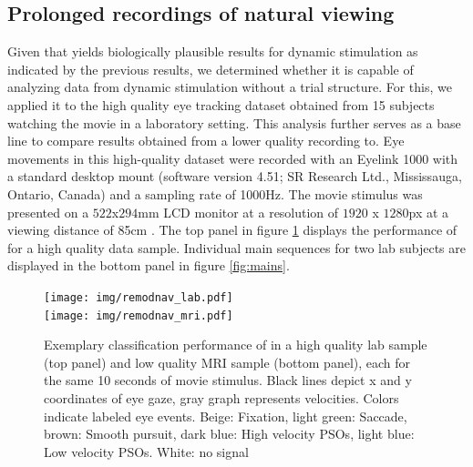 


\subsection*{Prolonged recordings of natural viewing}\label{ana_2}


Given that \remodnav yields biologically plausible results for dynamic stimulation as indicated by the previous
results, we determined whether it is capable of analyzing data from dynamic stimulation without a trial structure.
For this, we applied it to the high quality eye tracking dataset obtained from 15 subjects watching the movie in a
laboratory setting. This analysis further serves as a base line to compare results obtained from a lower quality
recording to. Eye movements in this high-quality dataset were recorded with an Eyelink 1000 with a standard desktop
mount (software version 4.51; SR Research Ltd., Mississauga, Ontario, Canada) and a sampling rate of 1000Hz. The
movie stimulus was presented on a $522$x$294$mm LCD monitor at a resolution of $1920$ x $1280$px at a viewing
distance of 85cm \citep{Hanke2016}.
The top panel in figure \ref{fig:remodnav} displays the performance of \remodnav for a high quality data sample.
Individual main sequences for two lab subjects are displayed in the bottom panel in figure \ref{fig:mains}.\\



\begin{figure}[h!]
    \texttt{[image: img/remodnav\_lab.pdf]} \\
    \texttt{[image: img/remodnav\_mri.pdf]}\\
    \caption{Exemplary classification performance of \remodnav in a high quality lab sample (top panel) and low
    quality MRI sample (bottom panel), each for the same 10 seconds of movie stimulus.
    Black lines depict x and y coordinates of eye gaze, gray graph represents velocities. Colors indicate labeled
    eye events. Beige: Fixation,
    light green: Saccade, brown: Smooth pursuit, dark blue: High velocity PSOs, light blue: Low velocity PSOs.
    White: no signal}
    \label{fig:remodnav}
\end{figure}

